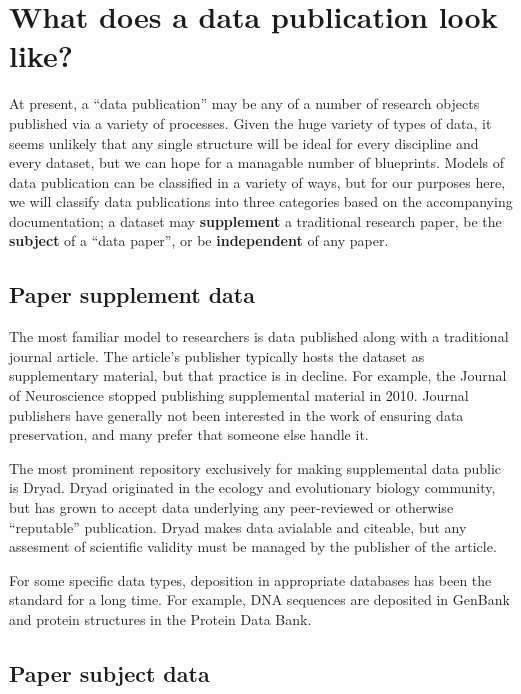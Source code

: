 \documentclass[10pt,a4paper,twocolumn]{article}
\begin{document}
\section*{What does a data publication look like?}\label{what-does-a-data-publication-look-like}

At present, a ``data publication'' may be any of a number of research objects published via a variety of processes.
Given the huge variety of types of data, it seems unlikely that any single structure will be ideal for every discipline and every dataset, but we can hope for a managable number of blueprints. 
Models of data publication can be classified in a variety of ways, but for our purposes here, we will classify data publications into three categories based on the accompanying documentation; a dataset may \textbf{supplement} a traditional research paper, be the \textbf{subject} of a ``data paper'', or be \textbf{independent} of any paper.

\subsection*{Paper supplement data}\label{paper-supplement-data}

The most familiar model to researchers is data published along with a traditional journal article. 
The article's publisher typically hosts the dataset as supplementary material, but that practice is in decline.
For example, the Journal of Neuroscience stopped publishing supplemental material in 2010\cite{maunsell_announcement_2010}. 
Journal publishers have generally not been interested in the work of ensuring data preservation, and many prefer that someone else handle it.

The most prominent repository exclusively for making supplemental data public is Dryad\cite{dryad}.
Dryad originated in the ecology and evolutionary biology community, but has grown to accept data underlying any peer-reviewed or otherwise ``reputable'' publication. Dryad makes data avialable and citeable, but any assesment of scientific validity must be managed by the publisher of the article. 

For some specific data types, deposition in appropriate databases has been the standard for a long time. 
For example, DNA sequences are deposited in GenBank\cite{genbank} and protein structures in the Protein Data Bank\cite{protein_data_bank}.

\subsection*{Paper subject data}\label{paper-subject-data}
\end{document}
